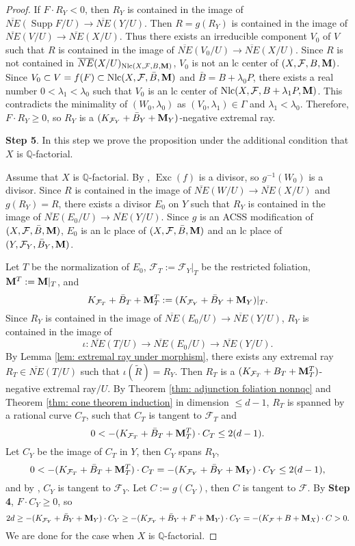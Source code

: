 \documentclass[11pt]{amsart}
\numberwithin{equation}{section}
\newcommand{\Mm}{{\bf{M}}}
\newcommand{\Qq}{\mathbb{Q}}
\newcommand{\Exc}{\operatorname{Exc}}
\newcommand{\Supp}{\operatorname{Supp}}
\newcommand{\Nlc}{\operatorname{Nlc}}
\newcommand{\Ff}{\mathcal{F}}
\newcommand{\Ii}{\Gamma}
\theoremstyle{definition}
\theoremstyle{definition}
\theoremstyle{definition}
\begin{document}
\begin{proof}
    If $F\cdot R_Y<0$, then $R_Y$ is contained in the image of $\overline{NE}(\Supp F/U)\rightarrow\overline{NE}(Y/U)$. Then $R=g(R_Y)$ is contained in the image of $\overline{NE}(V/U)\rightarrow\overline{NE}(X/U)$. Thus there exists an irreducible component $V_0$ of $V$ such that $R$ is contained in the image of $\overline{NE}(V_0/U)\rightarrow\overline{NE}(X/U)$.  Since $R$ is not contained in $\overline{NE}(X/U)_{\Nlc(X,\Ff,B,\Mm)}$, $V_0$ is not an lc center of $(X,\Ff,B,\Mm)$. Since $V_0\subset V=f(F)\subset\Nlc(X,\Ff,\bar B,\Mm)$ and $\bar B=B+\lambda_0P$, there exists a real number $0<\lambda_1<\lambda_0$ such that $V_0$ is an lc center of $\Nlc(X,\Ff,B+\lambda_1P,\Mm)$. This contradicts the minimality of $(W_0,\lambda_0)$ as $(V_0,\lambda_1)\in\Ii$ and $\lambda_1<\lambda_0$. Therefore, $F\cdot R_Y\geq 0$, so $R_Y$ is a  $(K_{\Ff_Y}+\bar B_Y+\Mm_Y)$-negative extremal ray.

\medskip

\noindent\textbf{Step 5}. In this step we prove the proposition under the additional condition that $X$ is $\Qq$-factorial. 

Assume that $X$ is $\Qq$-factorial. By \cite[Lemma 3.6.2]{BCHM10}, $\Exc(f)$ is a divisor, so $g^{-1}(W_0)$ is a divisor. Since $R$ is contained in the image of $\overline{NE}(W/U)\rightarrow\overline{NE}(X/U)$ and $g(R_Y)=R$, there exists a divisor $E_0$ on $Y$ such that $R_Y$ is contained in the image of $\overline{NE}(E_0/U)\rightarrow\overline{NE}(Y/U)$. Since $g$ is an ACSS modification of $(X,\Ff,\bar B,\Mm)$, $E_0$ is an lc place of $(X,\Ff,\bar B,\Mm)$ and an lc place of $(Y,\Ff_Y,\bar B_Y,\Mm)$. 

Let $T$ be the normalization of $E_0$, $\Ff_{T}:=\Ff_Y|_{T}$ be the restricted foliation, $\Mm^{T}:=\Mm|_{T}$, and
$$K_{\Ff_T}+\bar B_T+\Mm^T_T:=(K_{\Ff_Y}+\bar B_Y+\Mm_Y)|_T.$$
Since  $R_Y$ is contained in the image of $\overline{NE}(E_0/U)\rightarrow\overline{NE}(Y/U)$,  $R_Y$ is contained in the image of 
$$\iota: \overline{NE}(T/U)\rightarrow \overline{NE}(E_0/U)\rightarrow\overline{NE}(Y/U).$$ 
By Lemma \ref{lem: extremal ray under morphism}, there exists any extremal ray $R_T\in\overline{NE}(T/U)$ such that $\iota(\tilde R)=R_Y$. Then $R_T$ is a $(K_{\Ff_T}+B_T+\Mm^T_T)$-negative extremal ray$/U$. By Theorem \ref{thm: adjunction foliation nonnqc} and Theorem \ref{thm: cone theorem induction} in dimension $\leq d-1$, $R_T$ is spanned by a rational curve $C_T$, such that $C_T$ is tangent to $\Ff_T$ and
$$0<-(K_{\Ff_T}+\bar B_T+\Mm^T_T)\cdot C_T\leq 2(d-1).$$
Let $C_Y$ be the image of $C_T$ in $Y$, then $C_Y$ spans $R_Y$,
$$0<-(K_{\Ff_T}+\bar B_T+\Mm^T_T)\cdot C_T=-(K_{\Ff_Y}+\bar B_Y+\Mm_Y)\cdot C_Y\leq 2(d-1),$$
and by \cite[Lemma 3.3(4)]{ACSS21}, $C_Y$ is tangent to $\Ff_Y$. Let $C:=g(C_Y)$, then $C$ is tangent to $\Ff$. By \textbf{Step 4}, $F\cdot C_Y\geq 0$, so
$$2d\geq -(K_{\Ff_Y}+\bar B_Y+\Mm_Y)\cdot C_Y\geq -(K_{\Ff_Y}+\bar B_Y+F+\Mm_Y)\cdot C_Y=-(K_{\Ff}+B+\Mm_X)\cdot C>0.$$
We are done for the case when $X$ is $\Qq$-factorial.


\end{proof}
\end{document}
